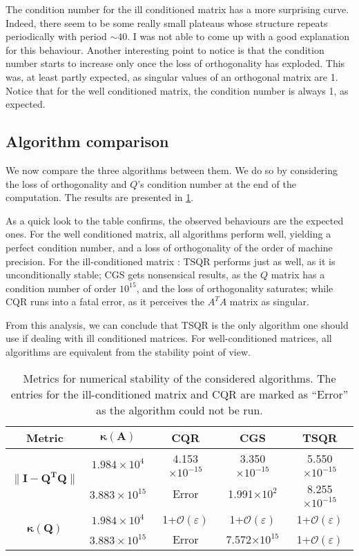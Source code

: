 \documentclass[a4paper, 12pt,oneside]{article}
\begin{document}
		The condition number for the ill conditioned matrix has a more surprising curve. Indeed, there seem to be some really small plateaus whose structure repeats periodically with period $\sim 40$. I was not able to come up with a good explanation for this behaviour. Another interesting point to notice is that the condition number starts to increase only once the loss of orthogonality has exploded. This was, at least partly expected, as singular values of an orthogonal matrix are 1. Notice that for the well conditioned matrix, the condition number is always 1, as expected. 
		\subsection{Algorithm comparison}
		We now compare the three algorithms between them. We do so by considering the loss of orthogonality and $Q$'s condition number at the end of the computation. The results are presented in \ref{tab:numberical-stability}.

		As a quick look to the table confirms, the observed behaviours are the expected ones. For the well conditioned matrix, all algorithms perform well, yielding a perfect condition number, and a loss of orthogonality of the order of machine precision. For the ill-conditioned matrix : TSQR performs just as well, as it is unconditionally stable; CGS gets nonsensical results, as the $Q$ matrix has a condition number of order $10^{15}$, and the loss of orthogonality saturates; while CQR runs into a fatal error, as it perceives the $A^TA$ matrix as singular.
		
		From this analysis, we can conclude that TSQR is the only algorithm one should use if dealing with ill conditioned matrices. For well-conditioned matrices, all algorithms are equivalent from the stability point of view.  
		\begin{table}[h]
			\centering
			\begin{tabular}{|c|c|c|c|c|}
			\hline
			\bf{Metric} & $\mathbf{\kappa(A)}$ & \bf{CQR} & \bf{CGS} & \bf{TSQR}  \\ \hline
			\multirow{2}{*}{$\mathbf{\|I-Q^TQ\|}$} & $1.984\times 10^{4}$  & 4.153$\times 10^{-15}$ & 3.350$\times 10^{-15}$ & 5.550$\times 10^{-15}$ \\ \cline{2-5} 
											  & $3.883\times 10^{15}$ & Error & 1.991$\times 10^{2}$ & 8.255$\times 10^{-15}$ \\ \hline
			\multirow{2}{*}{$\mathbf{\kappa(Q)}$} & $1.984\times 10^{4}$  & 1+$\mathcal{O}(\varepsilon)$ & 1+$\mathcal{O}(\varepsilon)$ & 1+$\mathcal{O}(\varepsilon)$ \\ \cline{2-5} 
											  & $3.883\times 10^{15}$ & Error & 7.572$\times 10^{15}$ & 1+$\mathcal{O}(\varepsilon)$ \\ \hline
			\end{tabular}
			\caption{Metrics for numerical stability of the considered algorithms. The entries for the ill-conditioned matrix and CQR are marked as ``Error'' as the algorithm could not be run.}
			\label{tab:numberical-stability}
			\end{table}
\end{document}
